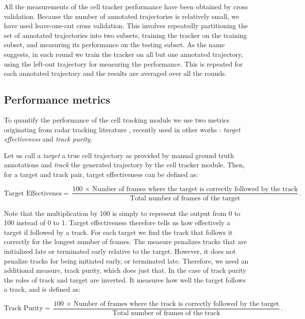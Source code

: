 	All the measurements of the cell tracker performance have been obtained by cross validation. Because the number of annotated trajectories is relatively small, we have used leave-one-out cross validation. This involves repeatedly partitioning the set of annotated trajectories into two subsets, training the tracker on the training subset, and measuring its performance on the testing subset. As the name suggests, in each round we train the tracker on all but one annotated trajectory, using the left-out trajectory for measuring the performance. This is repeated for each annotated trajectory and the results are averaged over all the rounds.

	\subsection{Performance metrics}
	
	To quantify the performance of the cell tracking module we use two metrics originating from radar tracking literature \cite{blackman99}, recently used in other works \cite{bise11global, huh13, eom07}: \textit{target effectiveness} and \textit{track purity}.
	
	Let us call a \textit{target} a true cell trajectory as provided by manual ground truth annotations and \textit{track} the generated trajectory by the cell tracker module. Then, for a target and track pair, target effectiveness can be defined as:
	
	\[
		\text{Target Effectivenes} = \frac{\text{100 $\times$ Number of frames where the target is correctly followed by the track}}{\text{Total number of frames of the target}}\text{.}
	\]
	
	Note that the multiplication by 100 is simply to represent the output from 0 to 100 instead of 0 to 1. 	Target effectiveness therefore tells us how effectively a target if followed by a track. For each target we find the track that follows it correctly for the longest number of frames. The measure penalizes tracks that are initialized late or terminated early relative to the target. However, it does not penalize tracks for being initiated early, or terminated late. Therefore, we need an additional measure, track purity, which does just that. In the case of track purity the roles of track and target are inverted. It measures how well the target follows a track, and is defined as:
	
	\[
		\text{Track Purity} = \frac{\text{100 $\times$ Number of frames where the track is correctly followed by the target}}{\text{Total number of frames of the track}}\text{.}
	\]
	
